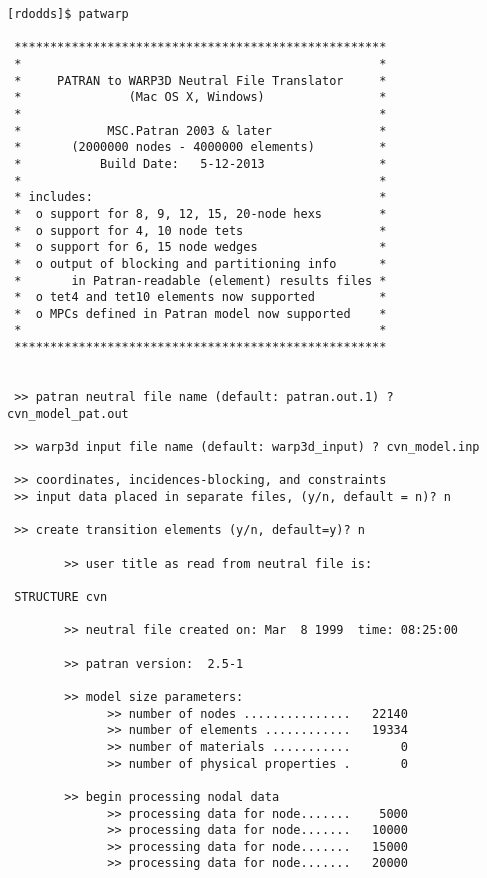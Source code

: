 \documentclass[11pt]{report}
\numberwithin{equation}{section}
\begin{document}
\small
\begin{verbatim}
[rdodds]$ patwarp

 ****************************************************
 *                                                  *
 *     PATRAN to WARP3D Neutral File Translator     *
 *               (Mac OS X, Windows)                *
 *                                                  *
 *            MSC.Patran 2003 & later               *
 *       (2000000 nodes - 4000000 elements)         *
 *           Build Date:   5-12-2013                *
 *                                                  *
 * includes:                                        *
 *  o support for 8, 9, 12, 15, 20-node hexs        *
 *  o support for 4, 10 node tets                   *
 *  o support for 6, 15 node wedges                 *
 *  o output of blocking and partitioning info      *
 *       in Patran-readable (element) results files *
 *  o tet4 and tet10 elements now supported         *
 *  o MPCs defined in Patran model now supported    *
 *                                                  *
 ****************************************************


 >> patran neutral file name (default: patran.out.1) ? cvn_model_pat.out

 >> warp3d input file name (default: warp3d_input) ? cvn_model.inp

 >> coordinates, incidences-blocking, and constraints
 >> input data placed in separate files, (y/n, default = n)? n

 >> create transition elements (y/n, default=y)? n

        >> user title as read from neutral file is:

 STRUCTURE cvn

        >> neutral file created on: Mar  8 1999  time: 08:25:00

        >> patran version:  2.5-1

        >> model size parameters:
              >> number of nodes ...............   22140
              >> number of elements ............   19334
              >> number of materials ...........       0
              >> number of physical properties .       0

        >> begin processing nodal data
              >> processing data for node.......    5000
              >> processing data for node.......   10000
              >> processing data for node.......   15000
              >> processing data for node.......   20000


\end{verbatim}
\end{document}
